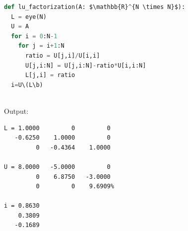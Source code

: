 \documentclass[book.tex]{subfiles}
\begin{document}
\begin{lstlisting}[language=python]
def lu_factorization(A: $\mathbb{R}^{N \times N}$):
  L = eye(N)
  U = A
  for i = 0:N-1
    for j = i+1:N
      ratio = U[j,i]/U[i,i]
      U[j,i:N] = U[j,i:N]-ratio*U[i,i:N]
      L[j,i] = ratio
  i=U\(L\b)
  
\end{lstlisting}
\begin{marginfigure}[-15\baselineskip]
	Output:
	\begin{Verbatim}
L = 1.0000         0         0
   -0.6250    1.0000         0
         0   -0.4364    1.0000
         
U = 8.0000   -5.0000         0
         0    6.8750   -3.0000
         0         0    9.6909%

i = 0.8630
    0.3809
   -0.1689
	\end{Verbatim}
\end{marginfigure}
\end{document}
